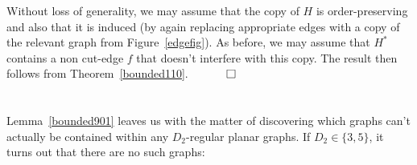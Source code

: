\documentclass{article}
\newtheorem{Proof of Theorem}{Proof of Theorem}
\begin{document}
Without loss of generality,
we may assume that the copy of $H$ is order-preserving 
and also that it is induced 
(by again replacing appropriate edges with a copy of the relevant graph from Figure~\ref{edgefig}).
As before,
we may assume that $H^{*}$ contains a non cut-edge $f$ that doesn't interfere with this copy.
The result then follows from Theorem~\ref{bounded110}.
$\phantom{qwerty}
\setlength{\unitlength}{.25cm}
\begin{picture}(1,1)
\put(0,0){\line(1,0){1}}
\put(0,0){\line(0,1){1}}
\put(1,1){\line(-1,0){1}}
\put(1,1){\line(0,-1){1}}
\end{picture}$ \\
\\
\\














Lemma~\ref{bounded901} leaves us with the matter of discovering which graphs 
can't actually be contained within any $D_{2}$-regular planar graphs.
If $D_{2} \in \{ 3,5 \}$, it turns out that there are no such graphs:
\end{document}
